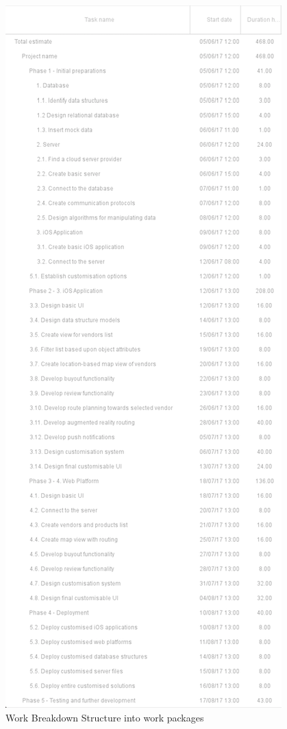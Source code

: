 
\begin{figure}[!ht]
\centering
\includegraphics[scale=0.86]{img/WBS.png}
\caption{Work Breakdown Structure into work packages}
\label{fig:wbs}
\end{figure}

